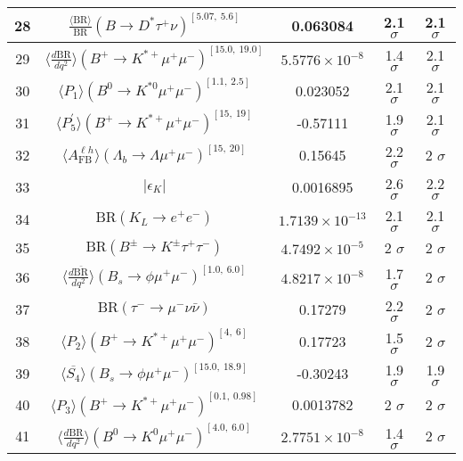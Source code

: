 \begin{longtable}{|c|c|c|c|c|}
28 &	 $\frac{\langle \mathrm{BR} \rangle}{\mathrm{BR}}(B\to D^\ast\tau^+\nu)^{[5.07,\  5.6]}$ &	 0.063084 &	 \cellcolor{green!0}2.1 $ \sigma$ &	 2.1 $ \sigma$ \\ \hline
29 &	 $\langle \frac{d\mathrm{BR}}{dq^2} \rangle(B^+\to K^{\ast +}\mu^+\mu^-)^{[15.0,\  19.0]}$ &	 $5.5776\times 10^{-8}$ &	 \cellcolor{green!37}1.4 $ \sigma$ &	 2.1 $ \sigma$ \\ \hline
30 &	 $\langle P_1\rangle(B^0\to K^{\ast 0}\mu^+\mu^-)^{[1.1,\  2.5]}$ &	 0.023052 &	 \cellcolor{green!0}2.1 $ \sigma$ &	 2.1 $ \sigma$ \\ \hline
31 &	 $\langle P_5^\prime\rangle(B^+\to K^{\ast +}\mu^+\mu^-)^{[15,\  19]}$ &	 -0.57111 &	 \cellcolor{green!7}1.9 $ \sigma$ &	 2.1 $ \sigma$ \\ \hline
32 &	 $\langle A_\mathrm{FB}^{\ell h}\rangle(\Lambda_b\to\Lambda \mu^+\mu^-)^{[15,\  20]}$ &	 0.15645 &	 \cellcolor{red!8}2.2 $ \sigma$ &	 2 $ \sigma$ \\ \hline
33 &	 $\vert\epsilon_K\vert$ &	 0.0016895 &	 \cellcolor{red!20}2.6 $ \sigma$ &	 2.2 $ \sigma$ \\ \hline
34 &	 $\mathrm{BR}(K_L\to e^+e^-)$ &	 $1.7139\times 10^{-13}$ &	 \cellcolor{red!0}2.1 $ \sigma$ &	 2.1 $ \sigma$ \\ \hline
35 &	 $\mathrm{BR}(B^\pm\to K^\pm \tau^+\tau^-)$ &	 $4.7492\times 10^{-5}$ &	 \cellcolor{green!3}2 $ \sigma$ &	 2 $ \sigma$ \\ \hline
36 &	 $\langle \frac{d\overline{\mathrm{BR}}}{dq^2} \rangle(B_s\to \phi \mu^+\mu^-)^{[1.0,\  6.0]}$ &	 $4.8217\times 10^{-8}$ &	 \cellcolor{green!16}1.7 $ \sigma$ &	 2 $ \sigma$ \\ \hline
37 &	 $\mathrm{BR}(\tau^-\to \mu^- \nu\bar\nu)$ &	 0.17279 &	 \cellcolor{red!10}2.2 $ \sigma$ &	 2 $ \sigma$ \\ \hline
38 &	 $\langle P_2\rangle(B^+\to K^{\ast +}\mu^+\mu^-)^{[4,\  6]}$ &	 0.17723 &	 \cellcolor{green!26}1.5 $ \sigma$ &	 2 $ \sigma$ \\ \hline
39 &	 $\langle \overline{S_4}\rangle(B_s\to \phi \mu^+\mu^-)^{[15.0,\  18.9]}$ &	 -0.30243 &	 \cellcolor{green!0}1.9 $ \sigma$ &	 1.9 $ \sigma$ \\ \hline
40 &	 $\langle P_3\rangle(B^+\to K^{\ast +}\mu^+\mu^-)^{[0.1,\  0.98]}$ &	 0.0013782 &	 \cellcolor{green!0}2 $ \sigma$ &	 2 $ \sigma$ \\ \hline
41 &	 $\langle \frac{d\mathrm{BR}}{dq^2} \rangle(B^0\to K^0\mu^+\mu^-)^{[4.0,\  6.0]}$ &	 $2.7751\times 10^{-8}$ &	 \cellcolor{green!30}1.4 $ \sigma$ &	 2 $ \sigma$ \\ \hline

\end{longtable}
